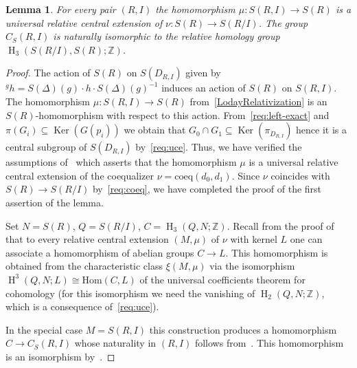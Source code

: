 \documentclass[oneside, 8pt]{amsart}
\newtheorem{lemma}{Lemma}
\theoremstyle{remark}
\theoremstyle{definition}
\numberwithin{lemma}{section}
\numberwithin{prop}{section}
\numberwithin{corollary}{section}
\numberwithin{externaltheorem}{section}
\DeclareMathOperator{\Ker}{Ker}
\DeclareMathOperator{\HH}{H}
\newcommand{\ZZ}{\mathbb{Z}}
\numberwithin{equation}{section}
\begin{document}
\begin{lemma}\label{lem:relativeH3}
 For every pair $(R, I)$ the homomorphism $\mu \colon S(R, I) \to S(R)$ is a universal relative central extension of $\nu \colon S(R) \to S(R/I)$. The group $C_S(R, I)$ is naturally isomorphic to the relative homology group $\HH_3(S(R/I), S(R); \ZZ)$.
\end{lemma}
\begin{proof}
The action of $S(R)$ on $S(D_{R, I})$ given by ${}^g h = S(\Delta)(g) \cdot h \cdot S(\Delta)(g)^{-1}$ induces an action of $S(R)$ on $S(R, I)$.
The homomorphism $\mu \colon S(R, I) \to S(R)$ from~\eqref{LodayRelativization} is an $S(R)$-homomorphism with respect to this action.
From~\ref{req:left-exact} and $\pi(G_i) \subseteq \Ker(G(p_i))$ we obtain that 
$G_0 \cap G_1 \subseteq \Ker(\pi_{D_{R, I}})$ hence it is a central subgroup of $S(D_{R,I})$ by~\ref{req:uce}. Thus, we have verified the assumptions of~\cite[Proposition~6]{Lo78} which asserts that the homomorphism $\mu$ is a universal relative central extension of the coequalizer $\nu = \mathrm{coeq}(d_0, d_1)$. Since $\nu$ coincides with $S(R) \to S(R/I)$ by~\ref{req:coeq}, we have completed the proof of the first assertion of the lemma.

Set $N = S(R)$, $Q = S(R/I)$, $C = \HH_3(Q, N; \ZZ)$. Recall from the proof of~\cite[Th{\'e}or{\`e}me~2]{Lo78} that to every relative central extension $(M, \mu)$ of $\nu$ with kernel $L$ one can associate a homomorphism of abelian groups $C \to L$. This homomorphism is obtained from the characteristic class $\xi(M, \mu)$ via the isomorphism $\HH^3(Q, N; L) \cong \mathrm{Hom}(C, L)$ of the universal coefficients theorem for cohomology (for this isomorphism we need the vanishing of $\HH_2(Q, N; \ZZ)$, which is a consequence of~\ref{req:uce}).

In the special case $M = S(R, I)$ this construction produces a homomorphism $C \to C_{S}(R, I)$ whose naturality in $(R, I)$ follows from~\cite[Proposition~3]{Lo78}. 
This homomorphism is an isomorphism by~\cite[Th{\'e}or{\`e}me~2]{Lo78}. \end{proof}
\end{document}
